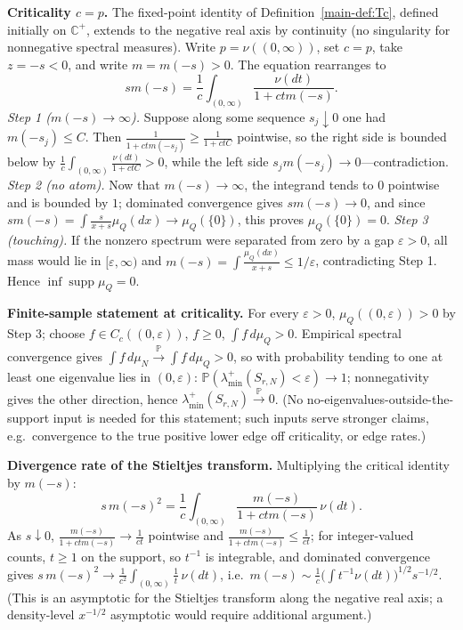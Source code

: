\textbf{Criticality $c=p$.} The fixed-point identity of Definition~\ref{main-def:Tc}, defined initially on $\mathbb C^+$, extends to the negative real axis by continuity (no singularity for nonnegative spectral measures). Write $p=\nu((0,\infty))$, set $c=p$, take $z=-s<0$, and write $m=m(-s)>0$. The equation rearranges to
\[
sm(-s)=\frac1c\int_{(0,\infty)}\frac{\nu(dt)}{1+ctm(-s)}.
\]
\emph{Step 1 ($m(-s)\to\infty$).} Suppose along some sequence $s_j\downarrow0$ one had $m(-s_j)\le C$. Then $\frac{1}{1+ctm(-s_j)}\ge\frac{1}{1+ctC}$ pointwise, so the right side is bounded below by $\frac1c\int_{(0,\infty)}\frac{\nu(dt)}{1+ctC}>0$, while the left side $s_jm(-s_j)\to0$—contradiction. \emph{Step 2 (no atom).} Now that $m(-s)\to\infty$, the integrand tends to $0$ pointwise and is bounded by $1$; dominated convergence gives $sm(-s)\to0$, and since $sm(-s)=\int\frac{s}{x+s}\mu_Q(dx)\to\mu_Q(\{0\})$, this proves $\mu_Q(\{0\})=0$. \emph{Step 3 (touching).} If the nonzero spectrum were separated from zero by a gap $\varepsilon>0$, all mass would lie in $[\varepsilon,\infty)$ and $m(-s)=\int\frac{\mu_Q(dx)}{x+s}\le1/\varepsilon$, contradicting Step 1. Hence $\inf\operatorname{supp}\mu_Q=0$.

\textbf{Finite-sample statement at criticality.} For every $\varepsilon>0$, $\mu_Q((0,\varepsilon))>0$ by Step 3; choose $f\in C_c((0,\varepsilon))$, $f\ge0$, $\int f\,d\mu_Q>0$. Empirical spectral convergence gives $\int f\,d\mu_N\xrightarrow{\mathbb P}\int f\,d\mu_Q>0$, so with probability tending to one at least one eigenvalue lies in $(0,\varepsilon)$: $\mathbb P(\lambda_{\min}^+(S_{r,N})<\varepsilon)\to1$; nonnegativity gives the other direction, hence $\lambda_{\min}^+(S_{r,N})\xrightarrow{\mathbb P}0$. (No no-eigenvalues-outside-the-support input is needed for this statement; such inputs serve stronger claims, e.g.\ convergence to the true positive lower edge off criticality, or edge rates.)

\textbf{Divergence rate of the Stieltjes transform.} Multiplying the critical identity by $m(-s)$:
\[
s\,m(-s)^2=\frac1c\int_{(0,\infty)}\frac{m(-s)}{1+ctm(-s)}\,\nu(dt).
\]
As $s\downarrow0$, $\frac{m(-s)}{1+ctm(-s)}\to\frac1{ct}$ pointwise and $\frac{m(-s)}{1+ctm(-s)}\le\frac1{ct}$; for integer-valued counts, $t\ge1$ on the support, so $t^{-1}$ is integrable, and dominated convergence gives $s\,m(-s)^2\to\frac1{c^2}\int_{(0,\infty)}\frac1t\,\nu(dt)$, i.e.\ $m(-s)\sim\frac1c\big(\int t^{-1}\nu(dt)\big)^{1/2}s^{-1/2}$. (This is an asymptotic for the Stieltjes transform along the negative real axis; a density-level $x^{-1/2}$ asymptotic would require additional argument.)

